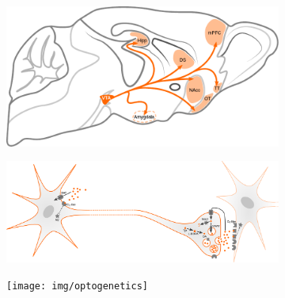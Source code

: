 \begin{sansmath}
\begin{figure}[h!]
	\centering
	\hspace*{\fill}
	\begin{subfigure}{.527\textwidth}
		\centering
		\vspace{-1em}
		\includegraphics[width=\textwidth]{img/model_literature}
		\caption{
			}
		\label{fig:ml}
	\end{subfigure}\hfill
	\begin{subfigure}{.44\textwidth}
		\centering
		\vspace{-2em}
		\vspace{-0.6em}
		\caption{
			}
		\label{fig:nm}
	\end{subfigure}
	\hspace*{\fill}
	\begin{subfigure}{.985\textwidth}
		\centering
		\vspace{.5em}
		\includegraphics[width=\textwidth]{img/da}
		\caption{
			}
		\label{fig:cm}
	\end{subfigure}
	\begin{subfigure}{.985\textwidth}
		\centering
		\vspace{.5em}
		\texttt{[image: img/optogenetics]}
		\caption{
			}
		\label{fig:og}
	\end{subfigure}

\end{figure}
\end{sansmath}
